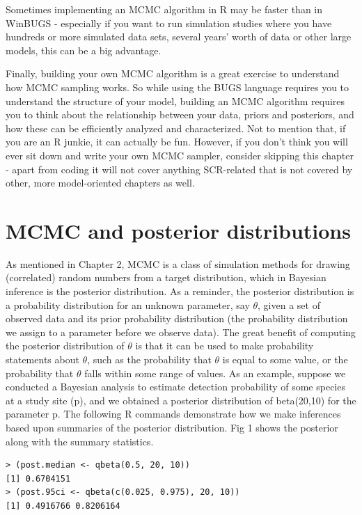 Sometimes implementing an MCMC algorithm in R may be faster than in
WinBUGS - especially if you want to run simulation studies where you
have hundreds or more simulated data sets, several years' worth of
data or other large models, this can be a big advantage.

Finally, building your own MCMC algorithm is a great exercise to understand how MCMC sampling works. So while using the BUGS language requires you to understand the structure of your model, building an MCMC algorithm requires you to think about the relationship between your data, priors and posteriors, and how these can be efficiently analyzed and characterized. Not to mention that, if you are an R junkie, it can actually be fun.
However, if you don't think you will ever sit down and write your own
MCMC sampler, consider skipping this chapter - apart from coding it
will not cover anything SCR-related that is not covered by other, more
model-oriented chapters as well.


\section{MCMC and posterior distributions}

As mentioned in Chapter 2, MCMC is a class of simulation methods for
drawing (correlated) random numbers from a target distribution, which
in Bayesian inference is the posterior distribution.
As a reminder, the posterior distribution is a probability
distribution for an unknown parameter, say $\theta$, given a set of
observed data and its prior probability distribution (the probability
distribution we assign to a parameter before we observe data).  The
great benefit of computing the posterior distribution of $\theta$ is
that it can be used to make probability statements about $\theta$,
such as the probability that $\theta$ is equal to some value, or the
probability that $\theta$ falls within some range of values. As an
example, suppose we conducted a Bayesian analysis to estimate
detection probability of some species at a study site (p), and we
obtained a posterior distribution of beta(20,10) for the parameter
p. The following R commands demonstrate how we make inferences based
upon summaries of the posterior distribution. Fig 1 shows the
posterior along with the summary statistics.

\begin{verbatim}
> (post.median <- qbeta(0.5, 20, 10))
[1] 0.6704151
> (post.95ci <- qbeta(c(0.025, 0.975), 20, 10))
[1] 0.4916766 0.8206164
\end{verbatim}


